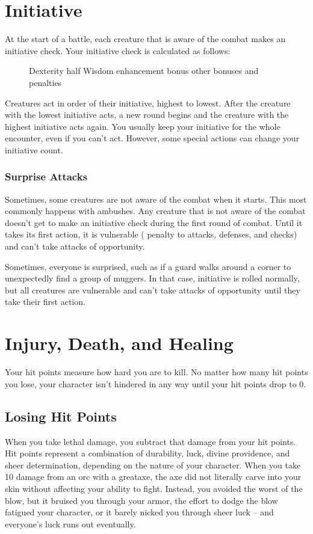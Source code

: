 \section{Initiative}\label{Initiative}

At the start of a battle, each creature that is aware of the combat makes an initiative check. Your initiative check is calculated as follows:

\begin{figure}[h]
    \centering Dexterity \add half Wisdom \add enhancement bonus \add other bonuses and penalties
\end{figure}

Creatures act in order of their initiative, highest to lowest. After the creature with the lowest initiative acts, a new round begins and the creature with the highest initiative acts again. You usually keep your initiative for the whole encounter, even if you can't act. However, some special actions can change your initiative count.

\subsubsection{Surprise Attacks}\label{Surprise Attacks}
Sometimes, some creatures are not aware of the combat when it starts. This most commonly happens with ambushes. Any creature that is not aware of the combat doesn't get to make an initiative check during the first round of combat. Until it takes its first action, it is vulnerable ( penalty to attacks, defenses, and checks) and can't take attacks of opportunity.

Sometimes, everyone is surprised, such as if a guard walks around a corner to unexpectedly find a group of muggers. In that case, initiative is rolled normally, but all creatures are vulnerable and can't take attacks of opportunity until they take their first action.

\section{Injury, Death, and Healing}\label{Injury, Death, and Healing}
Your hit points measure how hard you are to kill. No matter how many hit points you lose, your character isn't hindered in any way until your hit points drop to 0.

\subsection{Losing Hit Points}
When you take lethal damage, you subtract that damage from your hit points.
 Hit points represent a combination of durability, luck, divine providence, and sheer determination, depending on the nature of your character. When you take 10 damage from an orc with a greataxe, the axe did not literally carve into your skin without affecting your ability to fight. Instead, you avoided the worst of the blow, but it bruised you through your armor, the effort to dodge the blow fatigued your character, or it barely nicked you through sheer luck -- and everyone's luck runs out eventually.

